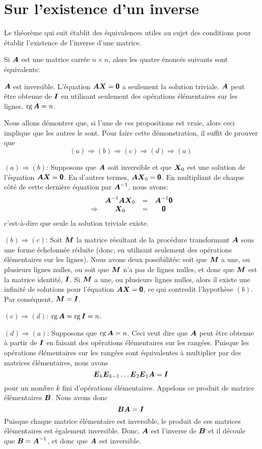 \section{Sur l'existence d'un inverse}

Le théorème qui suit établit des équivalences utiles au sujet des conditions pour établir l'existence de l'inverse d'une matrice.

\begin{theo}
\label{theo-inverse}
Si $\boldsymbol{A}$ est une matrice carrée $n\times n$, alors les quatre énoncés suivants sont équivalents:

 $\boldsymbol{A}$ est inversible.
 L'équation $\boldsymbol{A}\boldsymbol{X} = \mbox{\textsf{\textbf{{0}}}}$ a seulement la solution triviale.
 $\boldsymbol{A}$ peut être obtenue de $\boldsymbol{I}$ en utilisant seulement des opérations élémentaires sur les lignes.
 $\operatorname{rg}{\boldsymbol{A}} = n$.
\proof

Nous allons démontrer que, si l'une de ces propositions est vraie, alors ceci implique que les autres le sont.  Pour faire cette démonstration, il suffit de prouver que
\[
(a) \Rightarrow (b) \Rightarrow (c) \Rightarrow (d) \Rightarrow (a)
\]

$(a) \Rightarrow (b)$: Supposons que $\boldsymbol{A}$ soit inversible et que $\boldsymbol{X}_0$ est une solution de l'équation $\boldsymbol{A}\boldsymbol{X} = \mbox{\textsf{\textbf{{0}}}}$. 
En d'autres termes, $\boldsymbol{A}\boldsymbol{X}_0 = \mbox{\textsf{\textbf{{0}}}}$.  En multipliant de chaque côté de cette dernière équation par $\boldsymbol{A}^{-1}$, nous avons:
\[
\begin{matrix}
&\boldsymbol{A}^{-1}\boldsymbol{A}\boldsymbol{X}_0 &=& \boldsymbol{A}^{-1}\mbox{\textsf{\textbf{{0}}}} \\
{\color{blue}} \Rightarrow& \boldsymbol{X}_0 &=& \mbox{\textsf{\textbf{{0}}}}
\end{matrix}
\]
c'est-à-dire que seule la solution triviale existe.\medskip

$(b) \Rightarrow (c)$: Soit $\boldsymbol{M}$ la matrice résultant de la procédure transformant $\boldsymbol{A}$ sous une forme échelonnée réduite (donc, en utilisant seulement des opérations élémentaires sur les lignes).  Nous avons deux possibilités: soit que $\boldsymbol{M}$ a une, ou plusieurs lignes nulles, ou soit que $\boldsymbol{M}$ n'a pas de lignes nulles, et donc que $\boldsymbol{M}$ est la matrice identité, $\boldsymbol{I}$.  Si $\boldsymbol{M}$ a une, ou plusieurs lignes nulles, alors il existe une infinité de solutions pour l'équation $\boldsymbol{A}\boldsymbol{X}=\mbox{\textsf{\textbf{{0}}}}$, ce qui contredit l'hypothèse $(b)$.  Par conséquent, $\boldsymbol{M}=\boldsymbol{I}$.\medskip

$(c) \Rightarrow (d)$: $\operatorname{rg}{\boldsymbol{A}} = \operatorname{rg}{\boldsymbol{I}} = n$.\medskip

$(d) \Rightarrow (a)$: Supposons que $\operatorname{rg}{\boldsymbol{A}} = n$.  Ceci veut dire que $\boldsymbol{A}$ peut être obtenue à partir de $\boldsymbol{I}$ en faisant des opérations élémentaires sur les rangées.  Puisque les opérations élémentaires sur les rangées sont équivalentes à multiplier par des matrices élémentaires, nous avons
\[
\boldsymbol{E}_k \boldsymbol{E}_{k-1} \ldots \boldsymbol{E}_2 \boldsymbol{E}_1 \boldsymbol{A} = \boldsymbol{I}
\]
pour un nombre $k$ fini d'opérations élémentaires.     Appelons ce produit de matrice élémentaires $\boldsymbol{B}$.  Nous avons donc
\[
\boldsymbol{B}\boldsymbol{A} = \boldsymbol{I}
\]
Puisque chaque matrice élémentaire est inversible, le produit de ces matrices élémentaires est également inversible. Donc, $\boldsymbol{A}$ est l'inverse de $\boldsymbol{B}$ et il découle que $\boldsymbol{B} = \boldsymbol{A}^{-1}$, et donc que $\boldsymbol{A}$ est inversible.


\end{theo}
